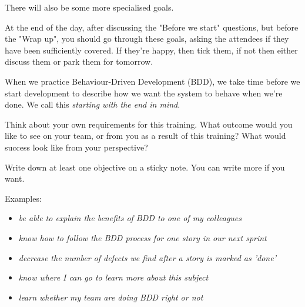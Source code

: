     There will also be some more specialised goals.
    
    At the end of the day, after discussing the "Before we start" questions, but before the "Wrap up", you should go through these goals, asking the attendees if they have been sufficiently covered. If they're happy, then tick them, if not then either discuss them or park them for tomorrow. 
\fi

\ifcontent
    When we practice Behaviour-Driven Development (BDD), we take time before we start development to describe how we want the system to behave when we're done. We call this \textit{starting with the end in mind}.
    
    Think about your own requirements for this training. What outcome would you like to see on your team, or from you as a result of this training? What would success look like from your perspective?
    
    Write down at least one objective on a sticky note. You can write more if you want.
    
    Examples:
    \begin{itemize}
        \item \textit{be able to explain the benefits of BDD to one of my colleagues}
        \item \textit{know how to follow the BDD process for one story in our next sprint}
        \item \textit{decrease the number of defects we find after a story is marked as 'done'}
        \item \textit{know where I can go to learn more about this subject}
        \item \textit{learn whether my team are doing BDD right or not}
    \end{itemize}
\fi


